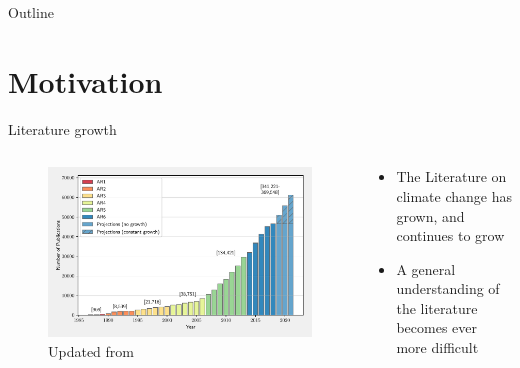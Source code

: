 \documentclass[9pt]{beamer}
\begin{document}
\begin{frame}{Outline}

\tableofcontents

\end{frame}

\section{Motivation}

\begin{frame}{Literature growth}

\begin{columns}
	\begin{column}{0.618\linewidth}
		\begin{figure}
			\includegraphics[width=\linewidth]{../plots/literature_size/pubs_time.pdf}
			\caption{Updated from \citet{Minx2017l}}
		\end{figure}
	\end{column}
	\begin{column}{0.382\linewidth}
		\begin{itemize}
			\item<2->  The Literature on climate change has grown, and continues to grow
			\item<3-> A general understanding of the literature becomes ever more difficult
			
		\end{itemize}
	\end{column}
\end{columns}

\end{frame}
\end{document}
